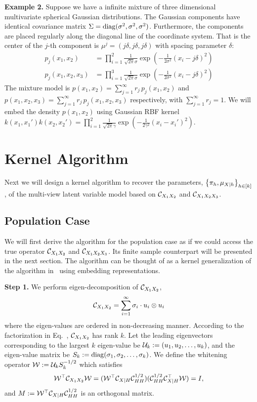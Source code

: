\documentclass{article}
\newcommand{\Note}[1]{{\color{red}{\bf\sf [note: #1]}}}
\begin{document}
{\bf Example 2.} Suppose we have a infinite mixture of three dimensional multivariate spherical Gaussian distributions. The Gaussian components have identical covariance matrix $\Sigma = \mathop{\mathrm{diag}}(\sigma^2,\sigma^2,\sigma^2)$. Furthermore, the components are placed regularly along the diagonal line of the coordinate system. That is the center of the $j$-th component is $\mu^j=(j\delta,j\delta,j\delta)$ with spacing parameter $\delta$:
\begin{align*}
  p_j(x_1,x_2) &= \prod_{i=1}^2 \frac{1}{\sqrt{2\pi}\sigma}\exp(-\frac{1}{2\sigma^2}(x_i -j\delta)^2)\\
  p_j(x_1,x_2,x_3) &= \prod_{i=1}^3 \frac{1}{\sqrt{2\pi}\sigma}\exp(-\frac{1}{2\sigma^2}(x_i -j\delta)^2)
\end{align*}
The mixture model is $p(x_1,x_2) = \sum_{j=1}^{\infty} r_j\, p_j(x_1,x_2)$ and
$p(x_1,x_2,x_3) = \sum_{j=1}^{\infty} r_j\, p_j(x_1,x_2,x_3)$ respectively, with $\sum_{j=1}^{\infty} r_j = 1$.
We will embed the density $p(x_1,x_2)$ using Gaussian RBF kernel $k(x_1,x_1')k(x_2,x_2') = \prod_{i=1}^2 \frac{1}{\sqrt{2\pi}\gamma}\exp(-\frac{1}{2\gamma^2}(x_i - x_i')^2)$.


\section{Kernel Algorithm}

Next we will design a kernel algorithm to recover the parameters, $\left\{\pi_h, \mu_{X|h}\right\}_{h \in [k]}$, of the multi-view latent variable model based on $\mathcal{C}_{X_1 X_2}$ and $\mathcal{C}_{X_1 X_2 X_3}$.

\Note{say something about how direct the replacement is.}

\subsection{Population Case}

We will first derive the algorithm for the population case as if we could access the true operator $\mathcal{C}_{X_1 X_2}$ and $\mathcal{C}_{X_1 X_2 X_3}$. Its finite sample counterpart will be presented in the next section. The algorithm can be thought of as a kernel generalization of the algorithm in~\cite{AnandkumarEtal:community12} using embedding representations.

{\bf Step 1.} We perform eigen-decomposition of $\mathcal{C}_{X_1 X_2}$,
$$\mathcal{C}_{X_1 X_2} = \sum_{i=1}^{\infty} \sigma_i \cdot u_i \otimes u_i$$
where the eigen-values are ordered in non-decreasing manner.
According to the factorization in Eq.~, $\mathcal{C}_{X_1 X_2}$ has rank $k$.
Let the leading eigenvectors corresponding to the largest $k$ eigen-value be  $\mathcal{U}_k:=(u_1,u_2,\ldots,u_k)$, and the eigen-value matrix be $S_k:=\mathop{\mathrm{diag}}(\sigma_1,\sigma_2,\ldots,\sigma_k)$. We define the whitening operator $\mathcal{W}:= \mathcal{U}_k S_k^{-1/2}$ which satisfies
\begin{align*}
  \mathcal{W}^\top \mathcal{C}_{X_1X_2} \mathcal{W} = (\mathcal{W}^\top \mathcal{C}_{X|H} \mathcal{C}_{HH}^{1/2}) (\mathcal{C}_{HH}^{1/2} \mathcal{C}_{X|H}^\top \mathcal{W}) = I,
\end{align*}
and $M:=\mathcal{W}^\top \mathcal{C}_{X|H} \mathcal{C}_{HH}^{1/2}$ is an orthogonal matrix.
\end{document}
